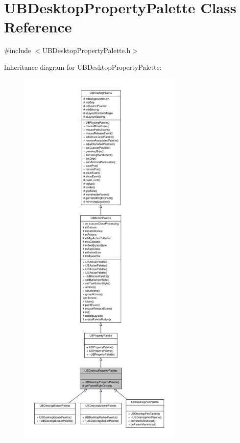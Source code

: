 \hypertarget{class_u_b_desktop_property_palette}{\section{U\-B\-Desktop\-Property\-Palette Class Reference}
\label{d7/dae/class_u_b_desktop_property_palette}
}


{\ttfamily \#include $<$U\-B\-Desktop\-Property\-Palette.\-h$>$}



Inheritance diagram for U\-B\-Desktop\-Property\-Palette\-:
\nopagebreak
\begin{figure}[H]
\begin{center}
\leavevmode
\includegraphics[height=550pt]{d9/d4b/class_u_b_desktop_property_palette__inherit__graph}
\end{center}
\end{figure}


